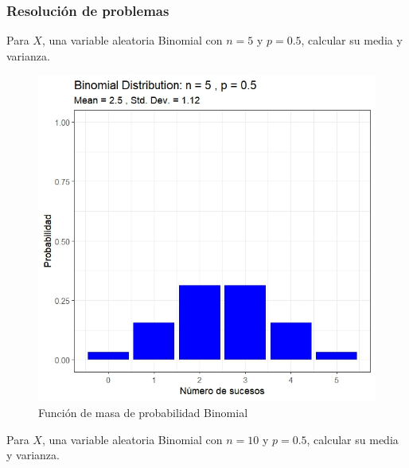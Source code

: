 \begin{i}
\subsubsection{Resolución de problemas}

Para $X$, una variable aleatoria Binomial con $n=5$ y $p=0.5$, calcular su media y varianza.

\begin{figure}[h!]
\centering
\includegraphics[scale=0.8]{Figuras/Binomial_n5.jpeg}
\caption{Función de masa de probabilidad Binomial}
\end{figure}

Para $X$, una variable aleatoria Binomial con $n=10$ y $p=0.5$, calcular su media y varianza. 


\end{i}
